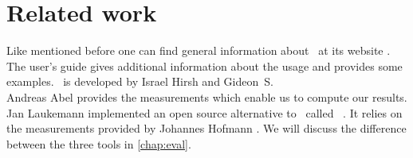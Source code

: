 \section{Related work}

Like mentioned before one can find general information about \iaca\ at its website \cite{iaca}. The user's guide \cite{userguide} gives additional information about the usage and provides some examples. \iaca\ is developed by Israel Hirsh and Gideon~S.\\

Andreas Abel \cite{Andreas} provides the measurements which enable us to compute our results.\\

Jan Laukemann \cite{osaca-thesis} implemented an open source alternative to \iaca\ called \osaca\ \cite{osaca-web}. It relies on the measurements provided by Johannes Hofmann \cite{ibench}. We will discuss the difference between the three tools in \autoref{chap:eval}.

